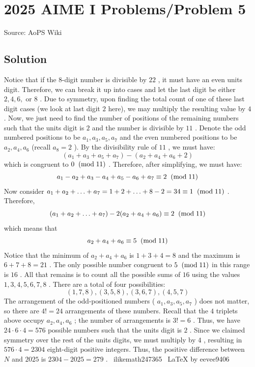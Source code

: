 \documentclass[12pt]{article}
\begin{document}
\section*{{2025 AIME I Problems/Problem 5}}
Source: AoPS Wiki

\subsection*{Solution}
Notice that if the 8-digit number is divisible by $22$ , it must have an even units digit. Therefore, we can break it up into cases and let the last digit be either $2, 4, 6,$ or $8$ . Due to symmetry, upon finding the total count of one of these last digit cases (we look at last digit $2$ here), we may multiply the resulting value by $4$ . Now, we just need to find the number of positions of the remaining numbers such that the units digit is $2$ and the number is divisible by $11$ . Denote the odd numbered positions to be $a_1, a_3, a_5, a_7$ and the even numbered positions to be $a_2, a_4, a_6$ (recall $a_8=2$ ). By the divisibility rule of $11$ , we must have: \[(a_1 + a_3 + a_5 + a_7) - (a_2 + a_4 + a_6 + 2)\] which is congruent to $0\hspace{2mm}(\text{mod}\hspace{1mm}11)$ . Therefore, after simplifying, we must have: \[a_1 - a_2 + a_3 - a_4 + a_5 - a_6 + a_7\equiv2\hspace{2mm}(\text{mod}\hspace{1mm}11)\] Now consider $a_1+ a_2 +\ldots + a_7=1+2+\ldots+8-2=34\equiv1\hspace{2mm}(\text{mod}\hspace{1mm}11)$ . Therefore, \[(a_1 + a_2 + \ldots+ a_7) - 2(a_2 + a_4 + a_6)\equiv2\hspace{2mm}(\text{mod}\hspace{1mm}11)\] which means that \[a_2 + a_4 + a_6\equiv5\hspace{2mm}(\text{mod}\hspace{1mm}11)\] Notice that the minimum of $a_2+a_4+a_6$ is $1 + 3 + 4 = 8$ and the maximum is $6 + 7 + 8 = 21$ . The only possible number congruent to $5\hspace{2mm}(\text{mod}\hspace{1mm}11)$ in this range is $16$ . All that remains is to count all the possible sums of $16$ using the values $1, 3, 4, 5, 6, 7, 8$ . There are a total of four possibilities: \[(1, 7, 8), (3, 5, 8), (3, 6, 7), (4, 5, 7)\] The arrangement of the odd-positioned numbers ( $a_1,a_3,a_5,a_7$ ) does not matter, so there are $4!=24$ arrangements of these numbers. Recall that the $4$ triplets above occupy $a_2,a_4,a_6$ ; the number of arrangements is $3!=6$ . Thus, we have $24\cdot6\cdot4=576$ possible numbers such that the units digit is $2$ . Since we claimed symmetry over the rest of the units digits, we must multiply by $4$ , resulting in $576\cdot4=2304$ eight-digit positive integers. Thus, the positive difference between $N$ and $2025$ is $2304 - 2025 = \boxed{279}$ . ~ilikemath247365 ~LaTeX by eevee9406
\end{document}
